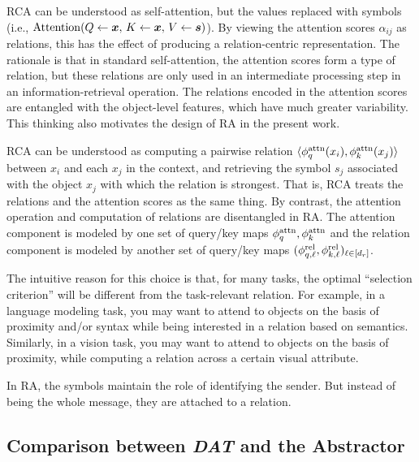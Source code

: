 RCA can be understood as self-attention, but the values replaced with symbols (i.e., $\mathrm{Attention}(Q \gets \bm{x},\, K \gets \bm{x},\, V \gets \bm{s})$). By viewing the attention scores $\alpha_{ij}$ as relations, this has the effect of producing a relation-centric representation. The rationale is that in standard self-attention, the attention scores form a type of relation, but these relations are only used in an intermediate processing step in an information-retrieval operation. The relations encoded in the attention scores are entangled with the object-level features, which have much greater variability. This thinking also motivates the design of RA in the present work.

RCA can be understood as computing a pairwise relation $\langle \phi_q^{\mathrm{attn}}(x_i), \phi_k^{\mathrm{attn}}(x_j) \rangle$ between $x_i$ and each $x_j$ in the context, and retrieving the symbol $s_j$ associated with the object $x_j$ with which the relation is strongest. That is, RCA treats the relations and the attention scores as the same thing. By contrast, the attention operation and computation of relations are disentangled in RA. The attention component is modeled by one set of query/key maps $\phi_q^{\mathrm{attn}}, \phi_k^{\mathrm{attn}}$ and the relation component is modeled by another set of query/key maps $(\phi_{q, \ell}^{\mathrm{rel}}, \phi_{k, \ell}^{\mathrm{rel}})_{\ell \in [d_r]}$.

The intuitive reason for this choice is that, for many tasks, the optimal ``selection criterion'' will be different from the task-relevant relation. For example, in a language modeling task, you may want to attend to objects on the basis of proximity and/or syntax while being interested in a relation based on semantics. Similarly, in a vision task, you may want to attend to objects on the basis of proximity, while computing a relation across a certain visual attribute.

In RA, the symbols maintain the role of identifying the sender. But instead of being the whole message, they are attached to a relation.

\subsection{Comparison between \textit{DAT} and the Abstractor}

